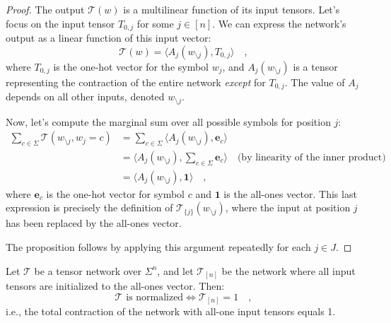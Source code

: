 \documentclass[../../main.tex]{subfiles}
\begin{document}
    \begin{proof}
The output $\mathcal{T}(w)$ is a multilinear function of its input tensors. Let's focus on the input tensor $T_{0,j}$ for some $j \in [n]$. We can express the network's output as a linear function of this input vector:
\[
    \mathcal{T}(w) = \langle A_j(w_{\setminus j}), T_{0,j} \rangle \quad ,
\]
where $T_{0,j}$ is the one-hot vector for the symbol $w_j$, and $A_j(w_{\setminus j})$ is a tensor representing the contraction of the entire network \emph{except} for $T_{0,j}$. The value of $A_j$ depends on all other inputs, denoted $w_{\setminus j}$.

Now, let's compute the marginal sum over all possible symbols for position $j$:
\begin{align*}
    \sum_{c \in \Sigma} \mathcal{T}(w_{\setminus j}, w_j=c) &= \sum_{c \in \Sigma} \langle A_j(w_{\setminus j}), \mathbf{e}_c \rangle \\
    &= \langle A_j(w_{\setminus j}), \sum_{c \in \Sigma} \mathbf{e}_c \rangle \quad \text{(by linearity of the inner product)} \\
    &= \langle A_j(w_{\setminus j}), \mathbf{1} \rangle \quad ,
\end{align*}
where $\mathbf{e}_c$ is the one-hot vector for symbol $c$ and $\mathbf{1}$ is the all-ones vector. This last expression is precisely the definition of $\mathcal{T}_{\{j\}}(w_{\setminus j})$, where the input at position $j$ has been replaced by the all-ones vector.

The proposition follows by applying this argument repeatedly for each $j \in J$.
\end{proof}

    \begin{corollary}
        \label{corollary:normalized_tensor_network}
        Let $\mathcal{T}$ be a tensor network over $\Sigma^n$, and let $\mathcal{T}_{[n]}$ be the network where all input tensors are initialized to the all-ones vector. Then:
        \[
            \mathcal{T} \text{ is normalized} \iff \mathcal{T}_{[n]} = 1 \quad ,
        \]
        i.e., the total contraction of the network with all-one input tensors equals 1.
    \end{corollary}
\end{document}
